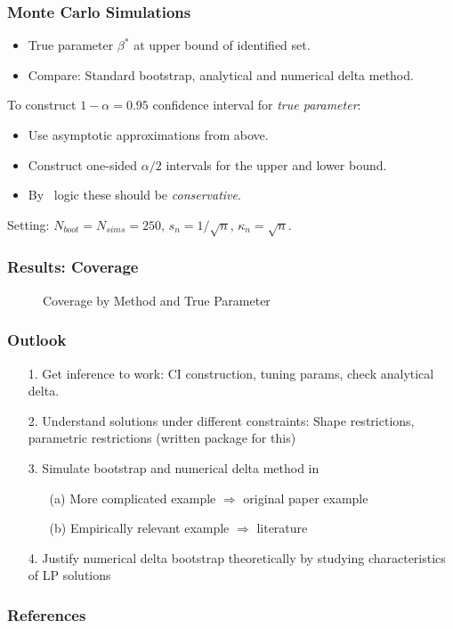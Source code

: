 \documentclass[11pt, aspectratio=169]{beamer}
\begin{document}
\begin{frame}
    \frametitle{Monte Carlo Simulations}

    \begin{itemize}
        \item True parameter $\beta^*$ at upper bound of identified set.
        \item Compare: Standard bootstrap, analytical and numerical delta method.
    \end{itemize}

    \vspace{0.5cm}

    To construct $1-\alpha = 0.95$ confidence interval for \textit{true parameter}:
    \begin{itemize}
        \item Use asymptotic approximations from above.
        \item Construct one-sided $\alpha/2$ intervals for the upper and lower bound.
        \item By~\cite{imbens2004confidence} logic these should be \textit{conservative}.
    \end{itemize}

    \vspace{0.5cm}

    Setting: $N_{boot} = N_{sims} = 250$, $s_n = 1 / \sqrt{n}$, $\kappa_n = \sqrt{n}$.

\end{frame}

\begin{frame}
    \frametitle{Results: Coverage}

    \begin{figure}
        \caption{Coverage by Method and True Parameter}
    \end{figure}

\end{frame}

\begin{frame}
    \frametitle{Outlook}
    \begin{itemize}
        \item[1.] Get inference to work: CI construction, tuning params, check analytical delta.
        \item[2.] Understand solutions under different constraints: Shape restrictions, parametric restrictions (written package for this)
        \item[3.] Simulate bootstrap and numerical delta method in
        \begin{itemize}
            \item[(a)] More complicated example $\Rightarrow$ original paper example
            \item[(b)] Empirically relevant example $\Rightarrow$ literature
        \end{itemize}
        \item[4.] Justify numerical delta bootstrap theoretically by studying characteristics of LP solutions
    \end{itemize}

\end{frame}

\begin{frame}[allowframebreaks]
    \frametitle{References}
    \renewcommand{\bibfont}{\normalfont\footnotesize}
    \printbibliography
\end{frame}
\end{document}
